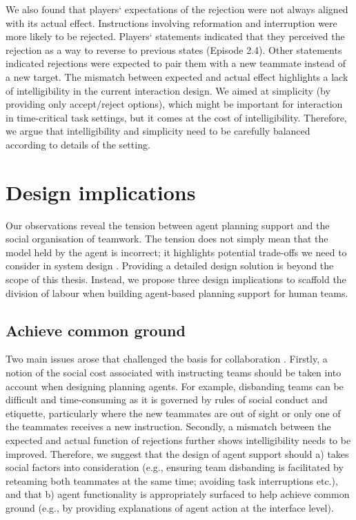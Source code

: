We also found that players` expectations of the rejection were not always aligned with its actual effect. Instructions involving reformation and interruption were more likely to be rejected. Players` statements indicated that they perceived the rejection as a way to reverse to previous states (Episode 2.4). Other statements indicated rejections were expected to pair them with a new teammate instead of a new target. The mismatch between expected and actual effect highlights a lack of intelligibility in the current interaction design. We aimed at simplicity (by providing only accept/reject options), which might be important for interaction in time-critical task settings, but it comes at the cost of intelligibility. Therefore, we argue that intelligibility and simplicity need to be carefully balanced according to details of the setting.\\


\section{Design implications}

Our observations reveal the tension between agent planning support and the social organisation of teamwork. The tension does not simply mean that the model held by the agent is incorrect; it highlights potential trade-offs we need to consider in system design \citep{Bowers1994,Sukthankar}. Providing a detailed design solution is beyond the scope of this thesis. Instead, we propose three design implications to scaffold the division of labour when building agent-based planning support for human teams.\\

\subsection{Achieve common ground}  
Two main issues arose that challenged the basis for collaboration \citep{Bradshaw2011}. Firstly, a notion of the social cost associated with instructing teams should be taken into account when designing planning agents. For example, disbanding teams can be difficult and time-consuming as it is governed by rules of social conduct and etiquette, particularly where the new teammates are out of sight or only one of the teammates receives a new instruction. Secondly, a mismatch between the expected and actual function of rejections further shows intelligibility needs to be improved. Therefore, we suggest that the design of agent support should a) takes social factors into consideration (e.g., ensuring team disbanding is facilitated by reteaming both teammates at the same time; avoiding task interruptions etc.), and that b) agent functionality is appropriately surfaced to help achieve common ground (e.g., by providing explanations of agent action at the interface level).

